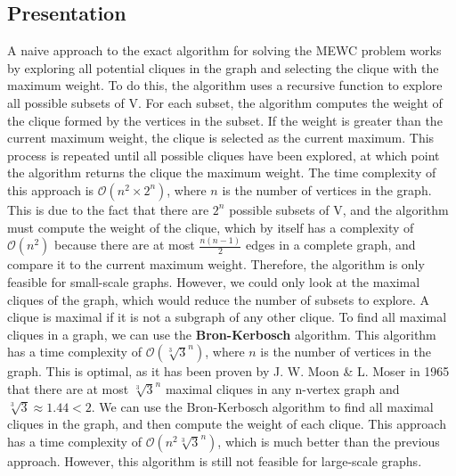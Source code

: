 \subsection{Presentation}

A naive approach to the exact algorithm for solving the MEWC problem works by
exploring all potential cliques in the graph and selecting the clique with the
maximum weight. To do this, the algorithm uses a recursive function to explore
all possible subsets of V. For each subset, the algorithm computes the weight of
the clique formed by the vertices in the subset. If the weight is greater than the
current maximum weight, the clique is selected as the current maximum. This
process is repeated until all possible cliques have been explored, at which point
the algorithm returns the clique the maximum weight.
\bigskip
The time complexity of this approach is $\mathcal{O}(n^2\times2^n)$, where $n$
is the number of vertices in the graph. This is due to the fact that there are
$2^n$ possible subsets of V, and the algorithm must compute the weight of the clique,
which by itself has a complexity of $\mathcal{O}(n^2)$ because there are at most
$\frac{n(n-1)}{2}$ edges in a complete graph, and compare it to the current
maximum weight. Therefore, the algorithm is only feasible for small-scale graphs.
\bigskip
However, we could only look at the maximal cliques of the graph, which would
reduce the number of subsets to explore. A clique is maximal if it is not a
subgraph of any other clique. To find all maximal cliques in a graph, we can use
the \textbf{Bron-Kerbosch} algorithm\cite{finding-all-cliques-of-an-undirected-graph}.
This algorithm has a time complexity of $\mathcal{O}(\sqrt[3]{3}^n)$, where $n$
is the number of vertices in the graph. This is optimal, as it has been proven by
J. W. Moon \& L. Moser in 1965\cite{on-cliques-in-graphs} that there are at most
$\sqrt[3]{3}^n$ maximal cliques in any n-vertex graph and $\sqrt[3]{3} \approx 1.44 < 2$.
\bigskip
We can use the Bron-Kerbosch algorithm to find all maximal cliques in the graph,
and then compute the weight of each clique. This approach has a time complexity of
$\mathcal{O}(n^2\sqrt[3]{3}^n)$, which is much better than the previous
approach. However, this algorithm is still not feasible for large-scale graphs.